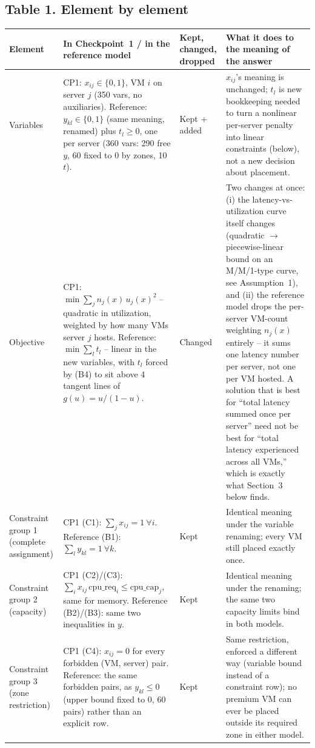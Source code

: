 \documentclass[11pt,a4paper]{article}
\begin{document}
\subsection*{Table 1. Element by element}
{\small
\begin{tabularx}{\textwidth}{@{}p{2.6cm}Xp{1.7cm}X@{}}
\toprule
Element & In Checkpoint~1 / in the reference model & Kept, changed, dropped & What it does to the meaning of the answer\\
\midrule
Variables & CP1: $x_{ij}\in\{0,1\}$, VM $i$ on server $j$ (350 vars, no auxiliaries). Reference: $y_{kl}\in\{0,1\}$ (same meaning, renamed) plus $t_l\ge0$, one per server (360 vars: 290 free $y$, 60 fixed to 0 by zones, 10 $t$). & Kept + added & $x_{ij}$'s meaning is unchanged; $t_l$ is new bookkeeping needed to turn a nonlinear per-server penalty into linear constraints (below), not a new decision about placement.\\
Objective & CP1: $\min \sum_j n_j(x)\,u_j(x)^2$ -- quadratic in utilization, weighted by how many VMs server $j$ hosts. Reference: $\min \sum_l t_l$ -- linear in the new variables, with $t_l$ forced by (B4) to sit above 4 tangent lines of $g(u)=u/(1-u)$. & Changed & Two changes at once: (i) the latency-vs-utilization curve itself changes (quadratic $\to$ piecewise-linear bound on an M/M/1-type curve, see Assumption~1), and (ii) the reference model drops the per-server VM-count weighting $n_j(x)$ entirely -- it sums one latency number per server, not one per VM hosted. A solution that is best for ``total latency summed once per server'' need not be best for ``total latency experienced across all VMs,'' which is exactly what Section~3 below finds.\\
Constraint group 1 (complete assignment) & CP1 (C1): $\sum_j x_{ij}=1\ \forall i$. Reference (B1): $\sum_l y_{kl}=1\ \forall k$. & Kept & Identical meaning under the variable renaming; every VM still placed exactly once.\\
Constraint group 2 (capacity) & CP1 (C2)/(C3): $\sum_i x_{ij}\,\mathrm{cpu\_req}_i\le \mathrm{cpu\_cap}_j$, same for memory. Reference (B2)/(B3): same two inequalities in $y$. & Kept & Identical meaning under the renaming; the same two capacity limits bind in both models.\\
Constraint group 3 (zone restriction) & CP1 (C4): $x_{ij}=0$ for every forbidden (VM, server) pair. Reference: the same forbidden pairs, as $y_{kl}\le 0$ (upper bound fixed to 0, 60 pairs) rather than an explicit row. & Kept & Same restriction, enforced a different way (variable bound instead of a constraint row); no premium VM can ever be placed outside its required zone in either model.\\

\end{tabularx}}
\end{document}
